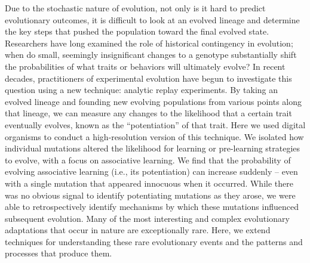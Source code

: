 
Due to the stochastic nature of evolution, not only is it hard to predict evolutionary outcomes, it is difficult to look at an evolved lineage and determine the key steps that pushed the population toward the final evolved state. 
Researchers have long examined the role of historical contingency in evolution; when do small, seemingly insignificant changes to a genotype substantially shift the probabilities of what traits or behaviors will ultimately evolve?
In recent decades, practitioners of experimental evolution have begun to investigate this question using a new technique: analytic replay experiments. 
By taking an evolved lineage and founding new evolving populations from various points along that lineage, we can measure any changes to the likelihood that a certain trait eventually evolves, known as the ``potentiation'' of that trait. 
Here we used digital organisms to conduct a high-resolution version of this technique.
We isolated how individual mutations altered the likelihood for learning or pre-learning strategies to evolve, with a focus on associative learning.
We find that the probability of evolving associative learning (i.e., its potentiation) can increase suddenly -- even with a single mutation that appeared innocuous when it occurred. 
While there was no obvious signal to identify potentiating mutations as they arose, we were able to retrospectively identify mechanisms by which these mutations influenced subsequent evolution.
Many of the most interesting and complex evolutionary adaptations that occur in nature are exceptionally rare.
Here, we extend techniques for understanding these rare evolutionary events and the patterns and processes that produce them.


